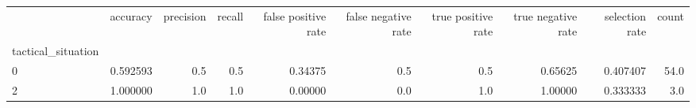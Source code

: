 \begin{tabular}{lrrrrrrrrr}
\toprule
{} &  accuracy &  precision &  recall &  false positive rate &  false negative rate &  true positive rate &  true negative rate &  selection rate &  count \\
tactical\_situation &           &            &         &                      &                      &                     &                     &                 &        \\
\midrule
0                  &  0.592593 &        0.5 &     0.5 &              0.34375 &                  0.5 &                 0.5 &             0.65625 &        0.407407 &   54.0 \\
2                  &  1.000000 &        1.0 &     1.0 &              0.00000 &                  0.0 &                 1.0 &             1.00000 &        0.333333 &    3.0 \\
\bottomrule
\end{tabular}
